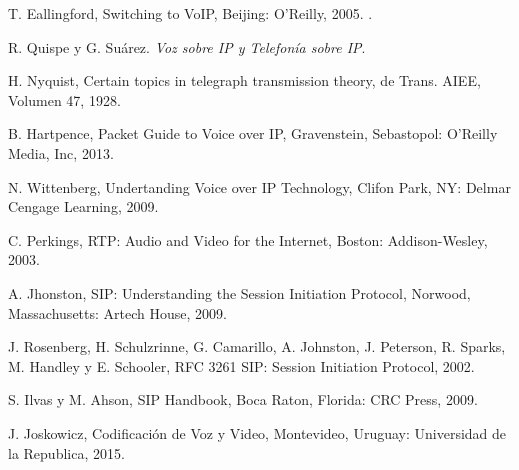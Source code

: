 	\begin{thebibliography}{15}
		T. Eallingford, Switching to VoIP, Beijing: O'Reilly, 2005. .
		
		R. Quispe y G. Suárez.	
		\textit{ Voz sobre IP y Telefonía sobre IP}.
		
		H. Nyquist, Certain topics in telegraph transmission theory, de Trans. AIEE, Volumen 47, 1928.
		
		B. Hartpence, Packet Guide to Voice over IP, Gravenstein, Sebastopol: O'Reilly Media, Inc, 2013. 
		
		N. Wittenberg, Undertanding Voice over IP Technology, Clifon Park, NY: Delmar Cengage Learning, 2009.
		
		C. Perkings, RTP: Audio and Video for the Internet, Boston: Addison-Wesley, 2003.
		
		A. Jhonston, SIP: Understanding the Session Initiation Protocol, Norwood, Massachusetts: Artech House, 2009.
		
		J. Rosenberg, H. Schulzrinne, G. Camarillo, A. Johnston, J. Peterson, R. Sparks, M. Handley y E. Schooler, RFC 3261 SIP: Session Initiation Protocol, 2002. 
		
		S. Ilvas y M. Ahson, SIP Handbook, Boca Raton, Florida: CRC Press, 2009.
		
		J. Joskowicz, Codificación de Voz y Video, Montevideo, Uruguay: Universidad de la Republica, 2015.
		
	\end{thebibliography}